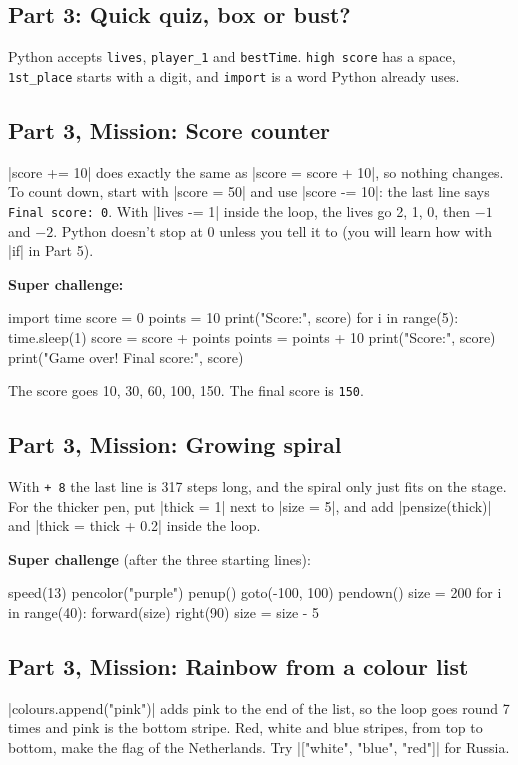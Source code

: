 \subsection*{Part 3: Quick quiz, box or bust?}
Python accepts \texttt{lives}, \texttt{player\_1} and \texttt{bestTime}. \texttt{high score} has a space, \texttt{1st\_place} starts with a digit, and \texttt{import} is a word Python already uses.

\subsection*{Part 3, Mission: Score counter}
\py|score += 10| does exactly the same as \py|score = score + 10|, so nothing changes. To count down, start with \py|score = 50| and use \py|score -= 10|: the last line says \texttt{Final score: 0}. With \py|lives -= 1| inside the loop, the lives go 2, 1, 0, then $-1$ and $-2$. Python doesn't stop at 0 unless you tell it to (you will learn how with \py|if| in Part 5).

\textbf{Super challenge:}
\begin{codenonum}
import time
score = 0
points = 10
print("Score:", score)
for i in range(5):
    time.sleep(1)
    score = score + points
    points = points + 10
    print("Score:", score)
print("Game over! Final score:", score)
\end{codenonum}
The score goes 10, 30, 60, 100, 150. The final score is \texttt{150}.

\subsection*{Part 3, Mission: Growing spiral}
With \texttt{+ 8} the last line is 317 steps long, and the spiral only just fits on the stage. For the thicker pen, put \py|thick = 1| next to \py|size = 5|, and add \py|pensize(thick)| and \py|thick = thick + 0.2| inside the loop.

\textbf{Super challenge} (after the three starting lines):
\begin{codenonum}
speed(13)
pencolor("purple")
penup()
goto(-100, 100)
pendown()
size = 200
for i in range(40):
    forward(size)
    right(90)
    size = size - 5
\end{codenonum}

\subsection*{Part 3, Mission: Rainbow from a colour list}
\py|colours.append("pink")| adds pink to the end of the list, so the loop goes round 7 times and pink is the bottom stripe. Red, white and blue stripes, from top to bottom, make the flag of the Netherlands. Try \py|["white", "blue", "red"]| for Russia.

